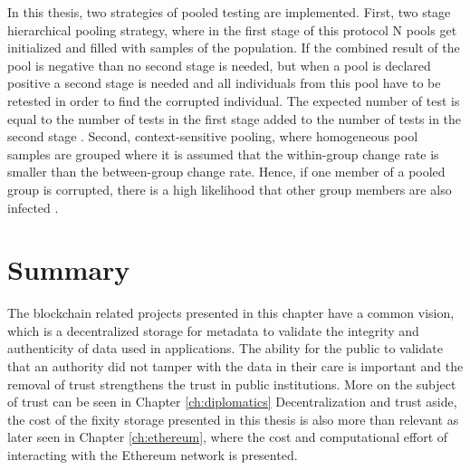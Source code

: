 In this thesis, two strategies of pooled testing are implemented. 
First, two stage hierarchical pooling strategy, where in the first stage of this protocol N pools get initialized and filled with samples of the population. If the combined result of the pool is negative than no second stage is needed, but when a pool is declared positive a second stage is needed and all individuals from this pool have to be retested in order to find the corrupted individual. The expected number of test is equal to the number of tests in the first stage added to the number of tests in the second stage \cite[3]{nianogo2021optimal}.
Second, context-sensitive pooling, where homogeneous pool samples are grouped where it is assumed that the within-group change rate is smaller than the between-group change rate. Hence, if one member of a pooled group is corrupted, there is a high likelihood that other group members are also infected \cite[3]{deckert2020simulation}.

\section{Summary}
The blockchain related projects presented in this chapter have a common vision, which is a decentralized storage for metadata to validate the integrity and authenticity of data used in applications. The ability for the public to validate that an authority did not tamper with the data in their care is important and the removal of trust strengthens the trust in public institutions. More on the subject of trust can be seen in Chapter \ref{ch:diplomatics}
Decentralization and trust aside, the cost of the fixity storage presented in this thesis is also more than relevant as later seen in Chapter \ref{ch:ethereum}, where the cost and computational effort of interacting with the Ethereum network is presented.
